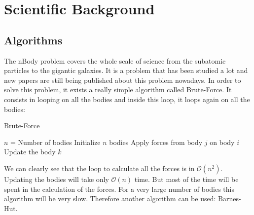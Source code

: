 \documentclass[11pt,a4paper]{article}
\begin{document}




\section{Scientific Background}
\subsection{Algorithms}

The nBody problem covers the whole scale of science from the subatomic particles to the gigantic galaxies. It is a problem that has been studied a lot and new papers are still being published about this problem nowadays. In order to solve this problem, it exists a really simple algorithm called Brute-Force. It consists in looping on all the bodies and inside this loop, it loops again on all the bodies:
\begin{algorithm}
\caption{Brute-Force}\label{bf}
\begin{algorithmic}[1]
\State $n$ = Number of bodies
\State Initialize $n$ bodies
\State Apply forces from body $j$ on body $i$
\EndFor
\EndFor
{}
\State Update the body $k$
\EndFor
\EndWhile
\end{algorithmic}
\end{algorithm}

We can clearly see that the loop to calculate all the forces is in $\mathcal{O}(n^2)$. Updating the bodies will take only $\mathcal{O}(n)$ time. But most of the time will be spent in the calculation of the forces. For a very large number of bodies this algorithm will be very slow. Therefore another algorithm can be used: Barnes-Hut.
\end{document}
